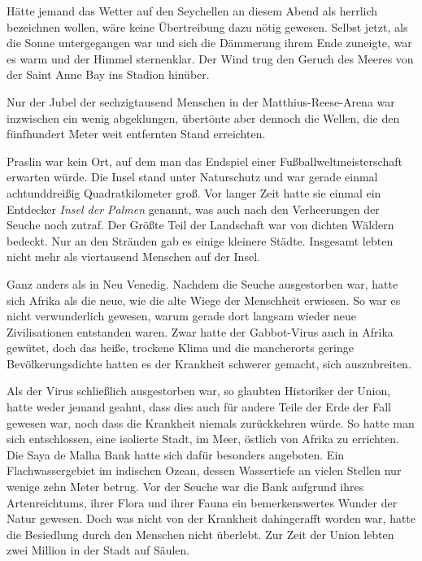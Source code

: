 Hätte jemand das Wetter auf den Seychellen an diesem Abend als herrlich bezeichnen wollen, wäre keine Übertreibung dazu nötig gewesen. Selbst jetzt, als die Sonne untergegangen war und sich die Dämmerung ihrem Ende zuneigte, war es warm und der Himmel sternenklar. Der Wind trug den Geruch des Meeres von der Saint Anne Bay ins Stadion hinüber.

\par

Nur der Jubel der sechzigtausend Menschen in der Matthius-Reese-Arena war inzwischen ein wenig abgeklungen, übertönte aber dennoch die Wellen, die den fünfhundert Meter weit entfernten Stand erreichten.

\par

Praslin war kein Ort, auf dem man das Endspiel einer Fußballweltmeisterschaft erwarten würde. Die Insel stand unter Naturschutz und war gerade einmal achtunddreißig Quadratkilometer groß. Vor langer Zeit hatte sie einmal ein Entdecker \textit{Insel der Palmen} genannt, was auch nach den Verheerungen der Seuche noch zutraf. Der Größte Teil der Landschaft war von dichten Wäldern bedeckt. Nur an den Stränden gab es einige kleinere Städte. Insgesamt lebten nicht mehr als viertausend Menschen auf der Insel.

\par

Ganz anders als in Neu Venedig. Nachdem die Seuche ausgestorben war, hatte sich Afrika als die neue, wie die alte Wiege der Menschheit erwiesen. So war es nicht verwunderlich gewesen, warum gerade dort langsam wieder neue Zivilisationen entstanden waren. Zwar hatte der Gabbot-Virus auch in Afrika gewütet, doch das heiße, trockene Klima und die mancherorts geringe Bevölkerungsdichte hatten es der Krankheit schwerer gemacht, sich auszubreiten.

\par

Als der Virus schließlich ausgestorben war, so glaubten Historiker der Union, hatte weder jemand geahnt, dass dies auch für andere Teile der Erde der Fall gewesen war, noch dass die Krankheit niemals zurückkehren würde. So hatte man sich entschlossen, eine isolierte Stadt, im Meer, östlich von Afrika zu errichten. Die Saya de Malha Bank hatte sich dafür besonders angeboten. Ein Flachwassergebiet im indischen Ozean, dessen Wassertiefe an vielen Stellen nur wenige zehn Meter betrug. Vor der Seuche war die Bank aufgrund ihres Artenreichtums, ihrer Flora und ihrer Fauna ein bemerkenswertes Wunder der Natur gewesen. Doch was nicht von der Krankheit dahingerafft worden war, hatte die Besiedlung durch den Menschen nicht überlebt. Zur Zeit der Union lebten zwei Million in der Stadt auf Säulen.

